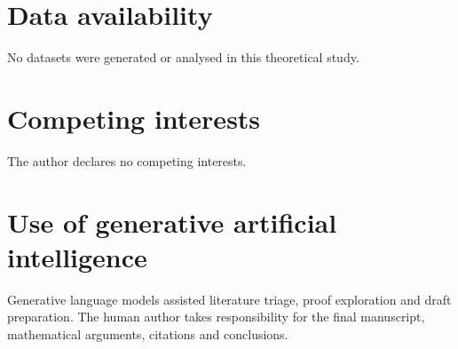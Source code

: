 \documentclass[10pt]{article}
\theoremstyle{definition}
\begin{document}
\section*{Data availability}

No datasets were generated or analysed in this theoretical study.

\section*{Competing interests}

The author declares no competing interests.

\section*{Use of generative artificial intelligence}

Generative language models assisted literature triage, proof exploration and
draft preparation.  The human author takes responsibility for the final
manuscript, mathematical arguments, citations and conclusions.
\end{document}
